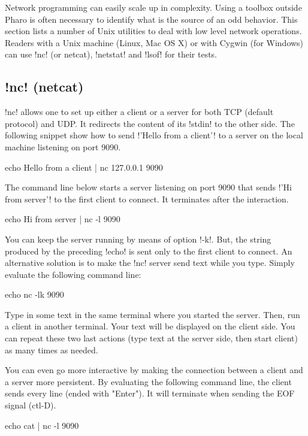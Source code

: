 \documentclass[a4paper,10pt,twoside]{book}
\begin{document}
Network programming can easily scale up in complexity. Using a toolbox outside Pharo is often necessary to identify what is the source of an odd behavior. This section lists a number of Unix utilities to deal with low level network operations.
Readers with a Unix machine (Linux, Mac OS X) or with Cygwin (for Windows) can use \ct!nc! (or netcat), \ct!netstat! and \ct!lsof! for their tests.

\subsection{\ct!nc! (netcat)}
\ct!nc! allows one to set up either a client or a server for both TCP (default protocol) and UDP.
It redirects the content of its \ct!stdin! to the other side.
The following snippet show how to send \ct!'Hello from a client'! to a server on the local machine listening on port 9090.
\begin{code}{}
echo Hello from a client | nc 127.0.0.1 9090 
\end{code}

The command line below starts a server listening on port 9090 that sends \ct!'Hi from server'! to the first client to connect.
It terminates after the interaction.
\begin{code}{}
echo Hi from server | nc -l 9090 
\end{code}

You can keep the server running by means of option \ct!-k!.
But, the string produced by the preceding \ct!echo! is sent only to the first client to connect.
An alternative solution is to make the \ct!nc! server send text while you type.
Simply evaluate the following command line:
\begin{code}{}
echo nc -lk 9090 
\end{code}

Type in some text in the same terminal where you started the server.
Then, run a client in another terminal.
Your text will be displayed on the client side.
You can repeat these two last actions (type text at the server side, then start client) as many times as needed.

You can even go more interactive by making the connection between a client and a server more persistent.
By evaluating the following command line, the client sends every line (ended with "Enter").
It will terminate when sending the EOF signal (ctl-D).
\begin{code}{}
echo cat | nc -l 9090 
\end{code}
\end{document}
